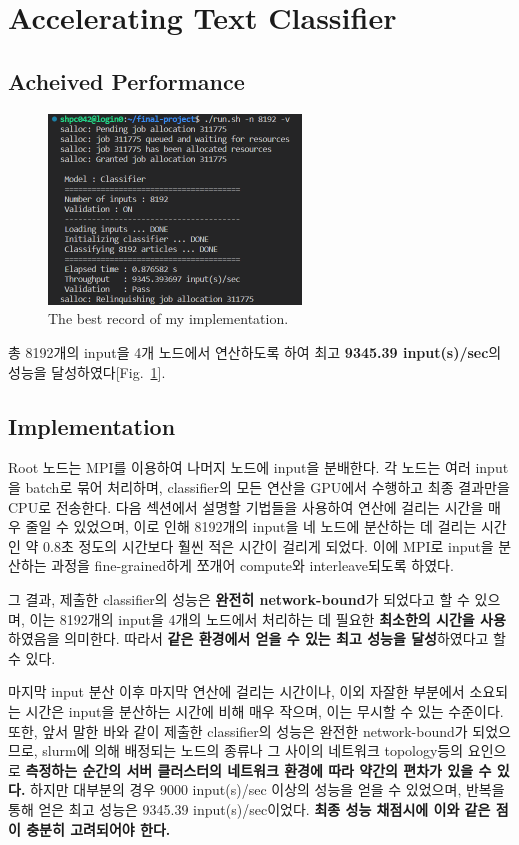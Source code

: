 \section{Accelerating Text Classifier}

\subsection{Acheived Performance}

\begin{figure}[h]
    \centering
    \includegraphics[width=0.6\textwidth]{imgs/best_record.png}
    \caption{The best record of my implementation.}
    \label{fig:best_record}
\end{figure}

총 8192개의 input을 4개 노드에서 연산하도록 하여 최고 
\textbf{9345.39 input(s)/sec}의 성능을 달성하였다[Fig.~\ref{fig:best_record}].

\subsection{Implementation}
Root 노드는 MPI를 이용하여 나머지 노드에 input을 분배한다.
각 노드는 여러 input을 batch로 묶어 처리하며,
classifier의 모든 연산을 GPU에서 수행하고 최종 결과만을 CPU로 전송한다.
다음 섹션에서 설명할 기법들을 사용하여 연산에 걸리는 시간을 매우 줄일 수 있었으며,
이로 인해 8192개의 input을 네 노드에 분산하는 데 걸리는 시간인
약 0.8초 정도의 시간보다 훨씬 적은 시간이 걸리게 되었다.
이에 MPI로 input을 분산하는 과정을 fine-grained하게 쪼개어 compute와 interleave되도록 하였다.

그 결과, 제출한 classifier의 성능은 \textbf{완전히 network-bound}가 되었다고 할 수 있으며,
이는 8192개의 input을 4개의 노드에서 처리하는 데 필요한 \textbf{최소한의 시간을 사용}하였음을 의미한다.
따라서 \textbf{같은 환경에서 얻을 수 있는 최고 성능을 달성}하였다고 할 수 있다.

마지막 input 분산 이후 마지막 연산에 걸리는 시간이나, 이외 자잘한 부분에서 소요되는 시간은
input을 분산하는 시간에 비해 매우 작으며, 이는 무시할 수 있는 수준이다.
또한, 앞서 말한 바와 같이 제출한 classifier의 성능은 완전한 network-bound가 되었으므로,
slurm에 의해 배정되는 노드의 종류나 그 사이의 네트워크 topology등의 요인으로
\textbf{측정하는 순간의 서버 클러스터의 네트워크 환경에 따라 약간의 편차가 있을 수 있다.}
하지만 대부분의 경우 9000 input(s)/sec 이상의 성능을 얻을 수 있었으며,
반복을 통해 얻은 최고 성능은 9345.39 input(s)/sec이었다.
\textbf{최종 성능 채점시에 이와 같은 점이 충분히 고려되어야 한다.}

